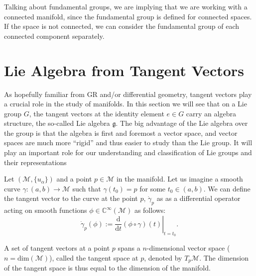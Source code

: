 \begin{remark}
    Talking about fundamental groups, we are implying that we are working with a connected manifold, since the fundamental group is defined for connected spaces. If the space is not connected, we can consider the fundamental group of each connected component separately.
\end{remark}

\section{Lie Algebra from Tangent Vectors}

As hopefully familiar from GR and/or differential geometry, tangent vectors play a crucial role in the study of manifolds. In this section we will see that on a Lie group \(G\), the tangent vectors at the identity element \(e \in G\) carry an algebra structure, the so-called Lie algebra \(\mathfrak{g}\). The big advantage of the Lie algebra over the group is that the algebra is first and foremost a vector space, and vector spaces are much more “rigid” and thus easier to study than the Lie group. It will play an important role for our understanding and classification of Lie groups and their representations

\begin{definition}
    Let \((\mathcal{M}, \{u_{\alpha}\})\) and a point \(p \in \mathcal{M}\) in the manifold. Let us imagine a smooth curve \(\gamma : (a, b) \to \mathcal{M}\) such that \(\gamma(t_0) = p\) for some \(t_0 \in (a,b)\). We can define the tangent vector to the curve at the point \(p\), \(\dot{\gamma}_p\) as as a differential operator acting on smooth functions \(\phi \in \mathbb{C}^{\infty}(\mathcal{M})\) as follows:
    \[
        \dot{\gamma}_p(\phi) := \left. \frac{\mathrm{d}}{\mathrm{d} t} (\phi \circ \gamma) (t)\right|_{t=t_0}.
    \]
\end{definition}

A set of tangent vectors at a point \(p\) spans a \(n\)-dimensional vector space (\(n = \mathrm{dim} (\mathcal{M})\)), called the tangent space at \(p\), denoted by \(T_p \mathcal{M}\). The dimension of the tangent space is thus equal to the dimension of the manifold.

